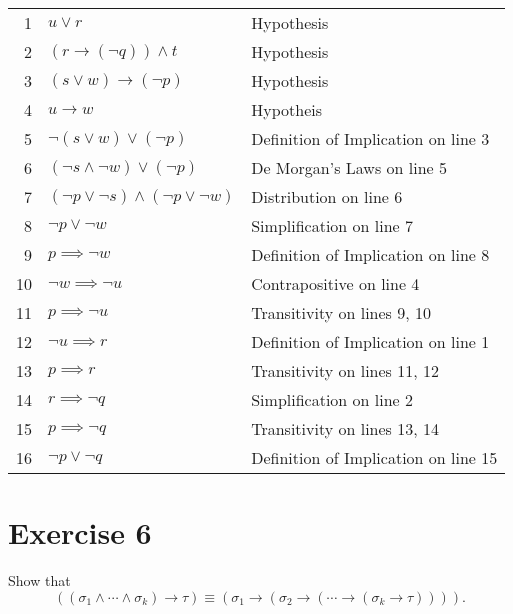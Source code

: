 \documentclass[12pt]{article}
\begin{document}
\begin{center}
    \begin{tabular}{r l l}
        1 & $u \lor r$ & Hypothesis \\
        2 & $(r \rightarrow (\neg q)) \land t$ & Hypothesis \\
        3 & $(s \lor w) \rightarrow (\neg p)$ & Hypothesis \\
        4 & $u\rightarrow w$ & Hypotheis \\
        \hline
        5 & $\lnot(s \lor w) \lor (\lnot p)$ & Definition of Implication on line 3 \\
        6 & $(\lnot s \land \lnot w) \lor (\lnot p)$ & De Morgan's Laws on line 5 \\
        7 & $(\lnot p \lor \lnot s) \land (\lnot p \lor \lnot w)$ & Distribution on line 6 \\
        8 & $\lnot p \lor \lnot w$ & Simplification on line 7 \\
        9 & $p \implies \lnot w$ & Definition of Implication on line 8 \\
        10 & $\lnot w \implies \lnot u$ & Contrapositive on line 4 \\
        11 & $p \implies \lnot u$ & Transitivity on lines 9, 10 \\
        12 & $\lnot u \implies r$ & Definition of Implication on line 1 \\
        13 & $p \implies r$ & Transitivity on lines 11, 12 \\
        14 & $r \implies \lnot q$ & Simplification on line 2 \\
        15 & $p \implies \lnot q$ & Transitivity on lines 13, 14 \\
        \hline
        16 & $\lnot p \lor \lnot q$ & Definition of Implication on line 15
    \end{tabular}    
\end{center}


\newpage
\section*{Exercise 6}
\begin{framed}
    Show that 
    \[((\sigma_1 \land \cdots \land \sigma_k) \rightarrow \tau) \equiv (\sigma_1 \rightarrow ( \sigma_2  \rightarrow (\cdots  \rightarrow (\sigma_k \rightarrow \tau)))).\]
\end{framed}
\end{document}
